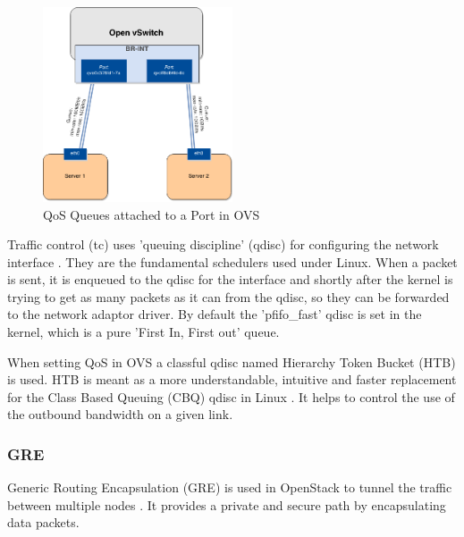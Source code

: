 \begin{figure}[H]
\centering
\includegraphics[width=0.5\textwidth]{images/fundamentals/openvswitch_qos-queues.png}
\caption{QoS Queues attached to a Port in OVS}
\end{figure}


Traffic control (tc) uses 'queuing discipline' (qdisc) for configuring the network interface \cite{tc-manual}. They are the fundamental schedulers used under Linux. When a packet is sent, it is enqueued to the qdisc for the interface and shortly after the kernel is trying to get as many packets as it can from the qdisc, so they can be forwarded to the network adaptor driver. By default the 'pfifo\_fast' qdisc is set in the kernel, which is a pure 'First In, First out' queue.

When setting QoS in OVS a classful qdisc named Hierarchy Token Bucket (HTB) is used. HTB is meant as a more understandable, intuitive and faster replacement for the Class Based Queuing (CBQ) qdisc in Linux \cite{htb-guide}. It helps to control the use of the outbound bandwidth on a given link. 


\subsubsection{GRE}

Generic Routing Encapsulation (GRE) is used in OpenStack to tunnel the traffic between multiple nodes \cite{gre-juniper}. It provides a private and secure path by encapsulating data packets.


